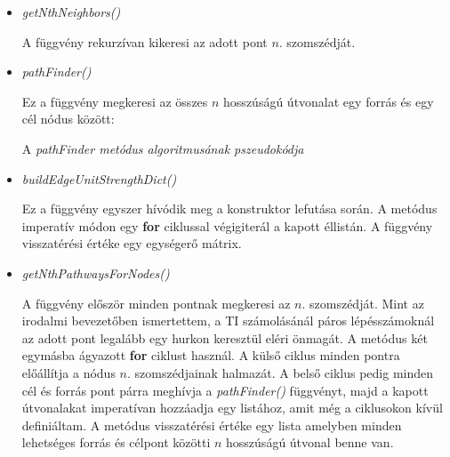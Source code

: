 \documentclass[a4paper,12pt]{article}
\newenvironment{imgdesc}{
		\small
		\singlespacing
		\begin{center}
		
	}{
		\end{center}	
	}
\begin{document}
		\begin{itemize}
			\item \textit{getNthNeighbors()}
			
			A függvény rekurzívan kikeresi az adott pont $n$. szomszédját.
		
			\item \textit{pathFinder()}
			
			Ez a függvény megkeresi az összes $n$ hosszúságú útvonalat egy forrás és egy cél nódus között:
			
			  		\begin{algorithm}[H]
						\footnotesize
						
						\SetAlgoVlined
						
						
						
			  		\end{algorithm}
			  		
			  		\begin{imgdesc}
			  			A \textit{pathFinder metódus algoritmusának pszeudokódja}
			  		\end{imgdesc}
			  		
			\item \textit{buildEdgeUnitStrengthDict()}
			
			Ez a függvény egyszer hívódik meg a konstruktor lefutása során. A metódus imperatív módon egy \textbf{for} ciklussal végigiterál a kapott éllistán. A függvény visszatérési értéke egy egységerő mátrix.
			  		
			\item \textit{getNthPathwaysForNodes()}
			
			A függvény először minden pontnak megkeresi az $n$. szomszédját.  Mint az irodalmi bevezetőben ismertettem, a TI számolásánál páros lépésszámoknál az adott pont legalább egy hurkon keresztül eléri önmagát. A metódus két egymásba ágyazott \textbf{for} ciklust használ. A külső ciklus minden pontra előállítja a nódus $n$. szomszédjainak halmazát. A belső ciklus pedig minden cél és forrás pont párra meghívja a \textit{pathFinder()} függvényt, majd a kapott útvonalakat imperatívan hozzáadja egy listához, amit még a ciklusokon kívül definiáltam. A metódus visszatérési értéke egy lista amelyben minden lehetséges forrás és célpont közötti $n$ hosszúságú útvonal benne van.
			

\end{itemize}
\end{document}

